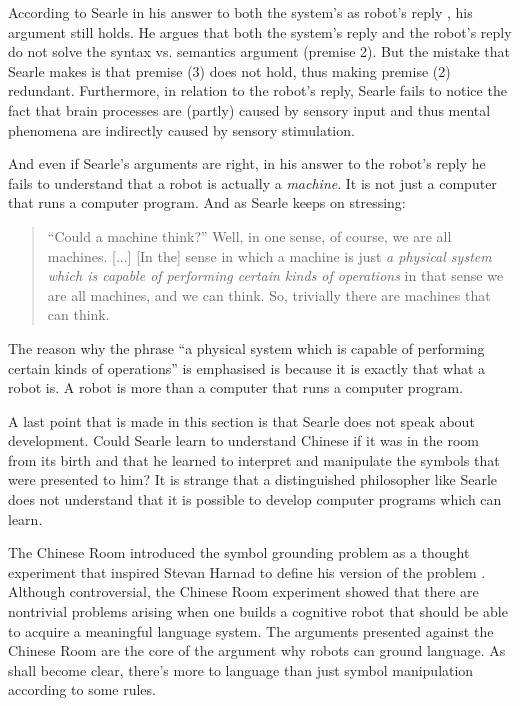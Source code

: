 According to Searle in his answer to both the system's as robot's reply \citep{searle:1984}, his argument still holds. He argues that both the system's reply and the robot's reply do not solve the syntax vs. semantics argument (premise 2). But the mistake that Searle makes is that premise (3) does not hold, thus making premise (2) redundant. Furthermore, in relation to the robot's reply, Searle fails to notice the fact that brain processes are (partly) caused by sensory input and thus mental phenomena are indirectly caused by sensory stimulation.

And even if Searle's arguments are right, in his answer to the robot's reply he fails to understand that a robot is actually a {\em machine}. It is not just a computer that runs a computer program. And as Searle keeps on stressing:

\begin{quote}
``Could a machine think?'' Well, in one sense, of course, we are all machines. [...] [In the] sense in which a machine is just \emph{a physical system which is capable of performing certain kinds of operations} in that sense we are all machines, and we can think. So, trivially there are machines that can think. \citep[35, my italics]{searle:1984}
\end{quote}

The reason why the phrase ``a physical system which is capable of performing certain kinds of operations'' is emphasised is because it is exactly that what a robot is. A robot is more than a computer that runs a computer program.

A last point that is made in this section is that Searle does not speak about development. Could Searle learn to understand Chinese if it was in the room from its birth and that he learned to interpret and manipulate the symbols that were presented to him? It is strange that a distinguished philosopher like Searle does not understand that it is possible to develop computer programs which can learn.

The Chinese Room introduced the symbol grounding problem as a thought experiment that inspired Stevan Harnad to define his version of the problem \citep{harnad:1990}. Although controversial, the Chinese Room experiment showed that there are nontrivial problems arising when one builds a cognitive robot that should be able to acquire a meaningful language system. The arguments presented against the Chinese Room are the core of the argument why robots can ground language. As shall become clear, there's more to language than just symbol manipulation according to some rules.

